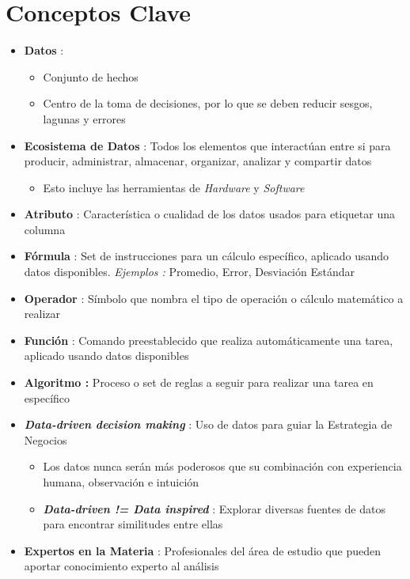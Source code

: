 \section{Conceptos Clave}
\begin{itemize}
    \item {\textbf{Datos} : 
    \begin{itemize}
        \item {Conjunto de hechos}
        \item {Centro de la toma de decisiones, por lo que se deben reducir sesgos, lagunas y errores}
    \end{itemize}}
    \item {\textbf{Ecosistema de Datos} : Todos los elementos que interactúan entre si para producir, administrar, almacenar, organizar, analizar y compartir datos
    \begin{itemize}
        \item {Esto incluye las herramientas de \textit{Hardware} y \textit{Software}}
    \end{itemize}}
    \item {\textbf{Atributo} : Característica o cualidad de los datos usados para etiquetar una columna}
    \item {\textbf{Fórmula} : Set de instrucciones para un cálculo específico, aplicado usando datos disponibles. \textit{Ejemplos : }Promedio, Error, Desviación Estándar}
    \item {\textbf{Operador} : Símbolo que nombra el tipo de operación o cálculo matemático a realizar}
    \item {\textbf{Función} : Comando preestablecido que realiza automáticamente una tarea, aplicado usando datos disponibles}
    \item {\textbf{Algoritmo : }Proceso o set de reglas a seguir para realizar una tarea en específico}
    \item {\textbf{\textit{Data-driven decision making}} : Uso de datos para guiar la Estrategia de Negocios 
    \begin{itemize}
        \item {Los datos nunca serán más poderosos que su combinación con experiencia humana, observación e intuición}
        \item {\textit{\textbf{Data-driven != Data inspired}} : Explorar diversas fuentes de datos para encontrar similitudes entre ellas}
    \end{itemize}}
    \item {\textbf{Expertos en la Materia} : Profesionales del área de estudio que pueden aportar conocimiento experto al análisis}

\end{itemize}
